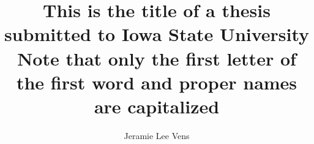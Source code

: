 \title{This is the title of a thesis
submitted to Iowa State University\\
Note that only the first letter of
the first word and proper names
are capitalized}
\author{Jeramie Lee Vens}
\notice
\maketitle
